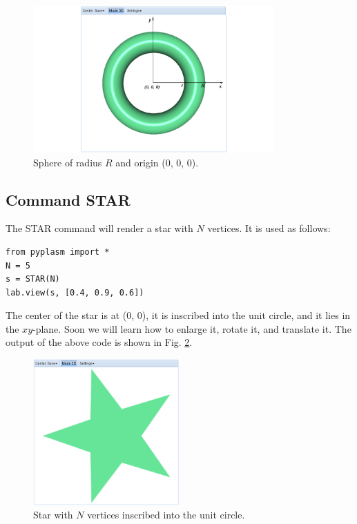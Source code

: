 \documentclass[article,A4,12pt]{llncs}
\begin{document}
\begin{figure}[!ht]
\begin{center}
\includegraphics[width=0.82\textwidth]{img/torus-1.png}
\end{center}
\vspace{-2mm}
\caption{Sphere of radius $R$ and origin (0, 0, 0).}
\label{fig:torus-1}
\end{figure}


\subsection{Command STAR}

The STAR command will render a star with $N$ vertices. It is used as follows:
\begin{verbatim}
from pyplasm import *
N = 5
s = STAR(N)
lab.view(s, [0.4, 0.9, 0.6])
\end{verbatim}
The center of the star is at (0, 0), it is inscribed into the unit circle,  
and it lies in the $xy$-plane. Soon we will learn how to enlarge it, rotate it,
and translate it. The
output of the above code is shown in Fig. \ref{fig:star-1}.

\newpage

\begin{figure}[!ht]
\begin{center}
\includegraphics[width=0.5\textwidth]{img/star-1.png}
\end{center}
\vspace{-2mm}
\caption{Star with $N$ vertices inscribed into the unit circle.}
\label{fig:star-1}
\end{figure}
\end{document}
